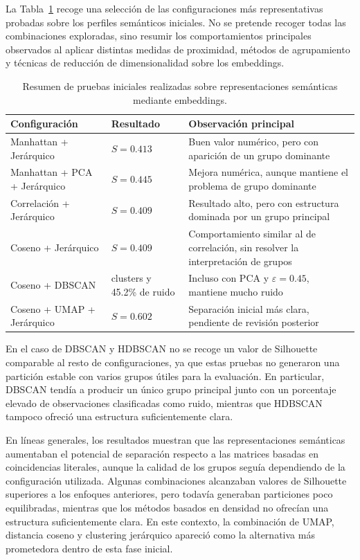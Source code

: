 \documentclass[11pt,spanish,listoffigures,listoftables]{tfgetsinf}
\begin{document}
La Tabla~\ref{tab:pruebas_embeddings_iniciales} recoge una selección de las configuraciones más representativas probadas sobre los perfiles semánticos iniciales. No se pretende recoger todas las combinaciones exploradas, sino resumir los comportamientos principales observados al aplicar distintas medidas de proximidad, métodos de agrupamiento y técnicas de reducción de dimensionalidad sobre los embeddings.

\begin{table}[H]
\centering
\small
\renewcommand{\arraystretch}{1.25}
\begin{tabular}{
>{\centering\arraybackslash}m{}
>{\centering\arraybackslash}m{}
m{}
}
\hline
\textbf{Configuración} & \textbf{Resultado} & \textbf{Observación principal} \\
\hline
Manhattan + Jerárquico & \(S=0.413\) & Buen valor numérico, pero con aparición de un grupo dominante \\
\hline
Manhattan + PCA + Jerárquico & \(S=0.445\) & Mejora numérica, aunque mantiene el problema de grupo dominante \\
\hline
Correlación + Jerárquico & \(S=0.409\) & Resultado alto, pero con estructura dominada por un grupo principal \\
\hline
Coseno + Jerárquico & \(S=0.409\) & Comportamiento similar al de correlación, sin resolver la interpretación de grupos \\
\hline
Coseno + DBSCAN & 2 clusters y 45.2\% de ruido & Incluso con PCA y \(\varepsilon=0.45\), mantiene mucho ruido \\
\hline
Coseno + UMAP + Jerárquico & \(S=0.602\) & Separación inicial más clara, pendiente de revisión posterior \\
\hline
\end{tabular}
\caption{Resumen de pruebas iniciales realizadas sobre representaciones semánticas mediante embeddings.}
\label{tab:pruebas_embeddings_iniciales}
\end{table}

En el caso de DBSCAN y HDBSCAN no se recoge un valor de Silhouette comparable al resto de configuraciones, ya que estas pruebas no generaron una partición estable con varios grupos útiles para la evaluación. En particular, DBSCAN tendía a producir un único grupo principal junto con un porcentaje elevado de observaciones clasificadas como ruido, mientras que HDBSCAN tampoco ofreció una estructura suficientemente clara.

En líneas generales, los resultados muestran que las representaciones semánticas aumentaban el potencial de separación respecto a las matrices basadas en coincidencias literales, aunque la calidad de los grupos seguía dependiendo de la configuración utilizada. Algunas combinaciones alcanzaban valores de Silhouette superiores a los enfoques anteriores, pero todavía generaban particiones poco equilibradas, mientras que los métodos basados en densidad no ofrecían una estructura suficientemente clara. En este contexto, la combinación de UMAP, distancia coseno y clustering jerárquico apareció como la alternativa más prometedora dentro de esta fase inicial.
\end{document}
